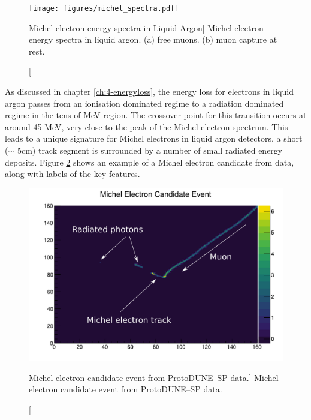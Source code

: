 \begin{figure}
	\centering
	\texttt{[image: figures/michel\_spectra.pdf]}
	\caption
	[Michel electron energy spectra in Liquid Argon]
	{Michel electron energy spectra in liquid argon. (a) free muons. (b) muon 
	capture at rest.}
	\label{fig:michel_spec}
\end{figure}


As discussed in chapter \ref{ch:4-energyloss}, the energy loss for electrons in
liquid argon passes from an ionisation dominated regime to a radiation dominated
regime in the tens of MeV region. The crossover point for this transition occurs
at around 45 MeV, very close to the peak of the Michel electron spectrum. This
leads to a unique signature for Michel electrons in liquid argon detectors, a
short ($\sim$ 5cm) track segment is surrounded by a number of small radiated 
energy deposits. Figure \ref{fig:michel_event} shows an example of a Michel 
electron candidate from \protodune{} data, along with labels of the key 
features.

\begin{figure}
	\centering
	\includegraphics[width=\textwidth]{figures/michel_candidate.pdf}
	\caption
	[Michel electron candidate event from ProtoDUNE--SP data.]
	{Michel electron candidate event from ProtoDUNE--SP data.}
	\label{fig:michel_event}
\end{figure}

